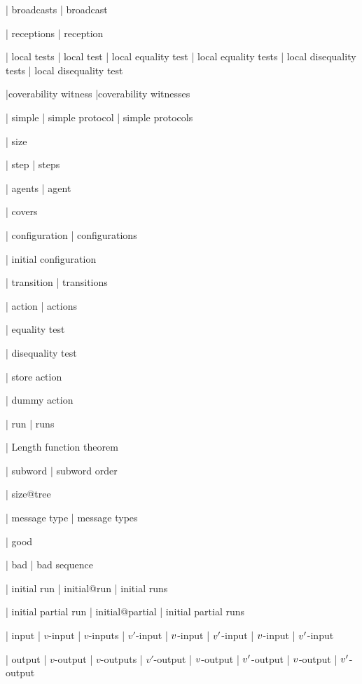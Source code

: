 | broadcasts
| broadcast

| receptions
| reception

| local tests
| local test
| local equality test
| local equality tests
| local disequality tests
| local disequality test

|coverability witness
|coverability witnesses

| simple
| simple protocol
| simple protocols

| size

| step
| steps

| agents
| agent

| covers

| configuration
| configurations

| initial configuration

| transition
| transitions

| action
| actions

| equality test

| disequality test

| store action

| dummy action


| run
| runs

| Length function theorem

| subword 
| subword order


| size@tree 

| message type
| message types

| good

| bad
| bad sequence

| initial run
| initial@run
| initial runs

| initial partial run
| initial@partial
| initial partial runs

| input
| $v$-input
| $v$-inputs
| $v'$-input
| $v$-input
| $v'$-input
| $v$-input
| $v'$-input

| output
| $v$-output
| $v$-outputs
| $v'$-output
| $v$-output
| $v'$-output
| $v$-output
| $v'$-output

